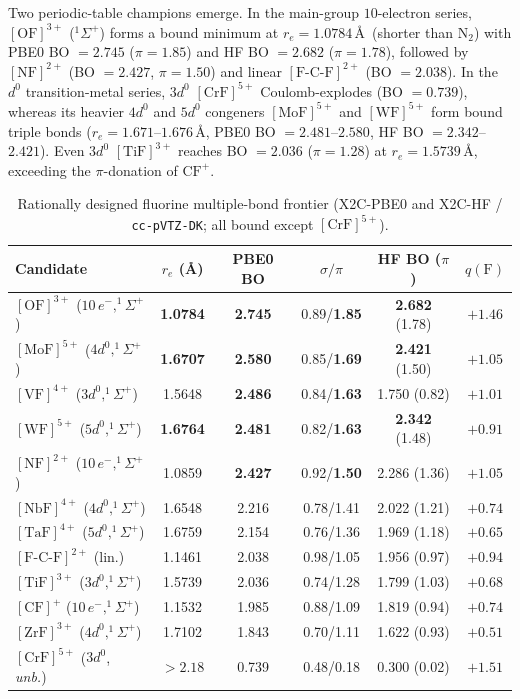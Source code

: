 \documentclass[10pt,twocolumn]{article}
\begin{document}
Two periodic-table champions emerge. In the main-group $10$-electron series, $[\mathrm{OF}]^{3+}$ ($^1\Sigma^+$) forms a bound minimum at $r_e = 1.0784\,$\AA\ (shorter than $\mathrm{N}_2$) with PBE0 BO $= 2.745$ ($\pi = 1.85$) and HF BO $= 2.682$ ($\pi = 1.78$), followed by $[\mathrm{NF}]^{2+}$ (BO $= 2.427$, $\pi = 1.50$) and linear $[\mathrm{F\text{-}C\text{-}F}]^{2+}$ (BO $= 2.038$). In the $d^0$ transition-metal series, $3d^0$ $[\mathrm{CrF}]^{5+}$ Coulomb-explodes (BO $= 0.739$), whereas its heavier $4d^0$ and $5d^0$ congeners $[\mathrm{MoF}]^{5+}$ and $[\mathrm{WF}]^{5+}$ form bound triple bonds ($r_e = 1.671$--$1.676\,$\AA, PBE0 BO $= 2.481$--$2.580$, HF BO $= 2.342$--$2.421$). Even $3d^0$ $[\mathrm{TiF}]^{3+}$ reaches BO $= 2.036$ ($\pi = 1.28$) at $r_e = 1.5739\,$\AA, exceeding the $\pi$-donation of $\mathrm{CF}^+$.

\begin{table}[t]
\centering
\caption{Rationally designed fluorine multiple-bond frontier (X2C-PBE0 and X2C-HF / \texttt{cc-pVTZ-DK}; all bound except $[\mathrm{CrF}]^{5+}$).}
\label{tab:design}
\scriptsize
\setlength{\tabcolsep}{1.2pt}
\begin{tabular}{@{}lccccc@{}}
\toprule
Candidate & $r_e$ (\AA) & PBE0 BO & $\sigma/\pi$ & HF BO ($\pi$) & $q(\mathrm{F})$ \\
\midrule
$[\mathrm{OF}]^{3+}$ ($10\,e^-, ^1\Sigma^+$) & \textbf{1.0784} & \textbf{2.745} & 0.89/\textbf{1.85} & \textbf{2.682} (1.78) & $+1.46$ \\
$[\mathrm{MoF}]^{5+}$ ($4d^0, ^1\Sigma^+$) & \textbf{1.6707} & \textbf{2.580} & 0.85/\textbf{1.69} & \textbf{2.421} (1.50) & $+1.05$ \\
$[\mathrm{VF}]^{4+}$ ($3d^0, ^1\Sigma^+$) & 1.5648 & \textbf{2.486} & 0.84/\textbf{1.63} & 1.750 (0.82) & $+1.01$ \\
$[\mathrm{WF}]^{5+}$ ($5d^0, ^1\Sigma^+$) & \textbf{1.6764} & \textbf{2.481} & 0.82/\textbf{1.63} & \textbf{2.342} (1.48) & $+0.91$ \\
$[\mathrm{NF}]^{2+}$ ($10\,e^-, ^1\Sigma^+$) & 1.0859 & \textbf{2.427} & 0.92/\textbf{1.50} & 2.286 (1.36) & $+1.05$ \\
$[\mathrm{NbF}]^{4+}$ ($4d^0, ^1\Sigma^+$) & 1.6548 & 2.216 & 0.78/1.41 & 2.022 (1.21) & $+0.74$ \\
$[\mathrm{TaF}]^{4+}$ ($5d^0, ^1\Sigma^+$) & 1.6759 & 2.154 & 0.76/1.36 & 1.969 (1.18) & $+0.65$ \\
$[\mathrm{F\text{-}C\text{-}F}]^{2+}$ (lin.) & 1.1461 & 2.038 & 0.98/1.05 & 1.956 (0.97) & $+0.94$ \\
$[\mathrm{TiF}]^{3+}$ ($3d^0, ^1\Sigma^+$) & 1.5739 & 2.036 & 0.74/1.28 & 1.799 (1.03) & $+0.68$ \\
$[\mathrm{CF}]^+$ ($10\,e^-, ^1\Sigma^+$) & 1.1532 & 1.985 & 0.88/1.09 & 1.819 (0.94) & $+0.74$ \\
$[\mathrm{ZrF}]^{3+}$ ($4d^0, ^1\Sigma^+$) & 1.7102 & 1.843 & 0.70/1.11 & 1.622 (0.93) & $+0.51$ \\
$[\mathrm{CrF}]^{5+}$ ($3d^0$, \textit{unb.}) & $>2.18$ & 0.739 & 0.48/0.18 & 0.300 (0.02) & $+1.51$ \\
\bottomrule
\end{tabular}
\end{table}
\end{document}
